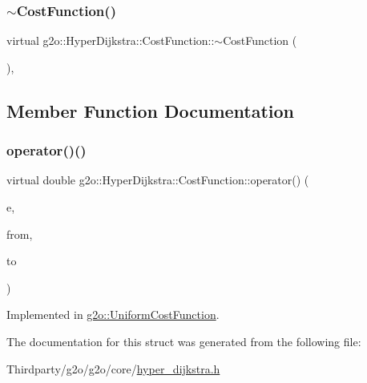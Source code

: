\subsubsection{\texorpdfstring{$\sim$\+Cost\+Function()}{~CostFunction()}}
{\footnotesize\ttfamily virtual g2o\+::\+Hyper\+Dijkstra\+::\+Cost\+Function\+::$\sim$\+Cost\+Function (\begin{DoxyParamCaption}{ }\end{DoxyParamCaption})\hspace{0.3cm}{\ttfamily [inline]}, {\ttfamily [virtual]}}



\subsection{Member Function Documentation}
\mbox{\label{structg2o_1_1_hyper_dijkstra_1_1_cost_function_a6d30ca80400c75941851ae079cfd42fd}} 
\subsubsection{\texorpdfstring{operator()()}{operator()()}}
{\footnotesize\ttfamily virtual double g2o\+::\+Hyper\+Dijkstra\+::\+Cost\+Function\+::operator() (\begin{DoxyParamCaption}\item[{\mbox{\hyperlink{classg2o_1_1_hyper_graph_1_1_edge}{Hyper\+Graph\+::\+Edge}} $\ast$}]{e,  }\item[{\mbox{\hyperlink{classg2o_1_1_hyper_graph_1_1_vertex}{Hyper\+Graph\+::\+Vertex}} $\ast$}]{from,  }\item[{\mbox{\hyperlink{classg2o_1_1_hyper_graph_1_1_vertex}{Hyper\+Graph\+::\+Vertex}} $\ast$}]{to }\end{DoxyParamCaption})\hspace{0.3cm}{\ttfamily [pure virtual]}}



Implemented in \mbox{\hyperlink{structg2o_1_1_uniform_cost_function_a44e15e4af4310890d4c7965cb6c7aaad}{g2o\+::\+Uniform\+Cost\+Function}}.



The documentation for this struct was generated from the following file\+:\begin{DoxyCompactItemize}
\item 
Thirdparty/g2o/g2o/core/\mbox{\hyperlink{hyper__dijkstra_8h}{hyper\+\_\+dijkstra.\+h}}\end{DoxyCompactItemize}
